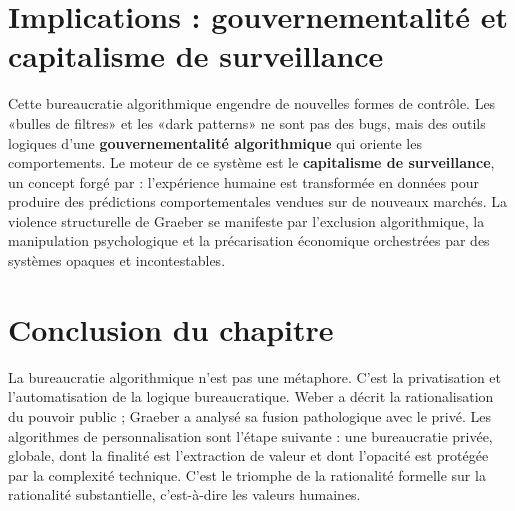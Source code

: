 \section{Implications : gouvernementalité et capitalisme de surveillance}
Cette bureaucratie algorithmique engendre de nouvelles formes de contrôle. Les «bulles de filtres» \citep{Pariser2011The} et les «dark patterns» ne sont pas des bugs, mais des outils logiques d'une \textbf{gouvernementalité algorithmique} qui oriente les comportements. Le moteur de ce système est le \textbf{capitalisme de surveillance}, un concept forgé par \citet{Zuboff2020The} : l'expérience humaine est transformée en données pour produire des prédictions comportementales vendues sur de nouveaux marchés. La violence structurelle de Graeber se manifeste par l'exclusion algorithmique, la manipulation psychologique et la précarisation économique orchestrées par des systèmes opaques et incontestables.

\section{Conclusion du chapitre}
La bureaucratie algorithmique n'est pas une métaphore. C'est la privatisation et l'automatisation de la logique bureaucratique. Weber a décrit la rationalisation du pouvoir public ; Graeber a analysé sa fusion pathologique avec le privé. Les algorithmes de personnalisation sont l'étape suivante : une bureaucratie privée, globale, dont la finalité est l'extraction de valeur et dont l'opacité est protégée par la complexité technique. C'est le triomphe de la rationalité formelle sur la rationalité substantielle, c'est-à-dire les valeurs humaines.
